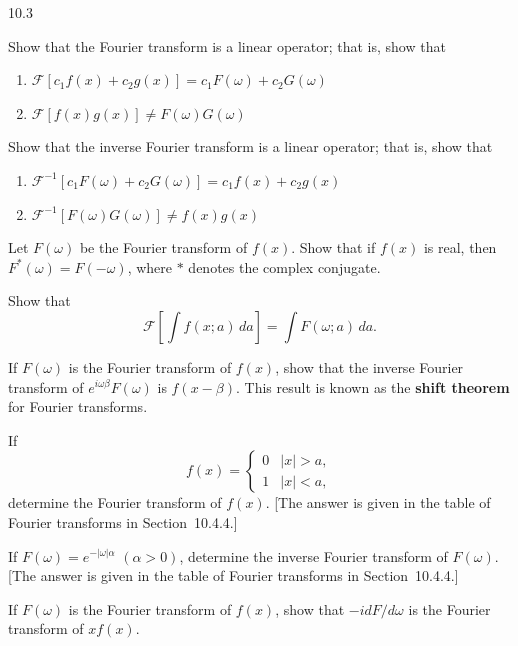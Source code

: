 \begin{exercises}{10.3}
\item Show that the Fourier transform is a linear operator; that is, show that
\begin{enumerate}
\item[(a)] $\mathcal{F}[c_1 f(x) + c_2 g(x)] = c_1 F(\omega) + c_2 G(\omega)$
\item[(b)] $\mathcal{F}[f(x)g(x)] \ne F(\omega)G(\omega)$
\end{enumerate}

\item Show that the inverse Fourier transform is a linear operator; that is, show that
\begin{enumerate}
\item[(a)] $\mathcal{F}^{-1}[c_1 F(\omega) + c_2 G(\omega)] = c_1 f(x) + c_2 g(x)$
\item[(b)] $\mathcal{F}^{-1}[F(\omega)G(\omega)] \ne f(x)g(x)$
\end{enumerate}

\item Let $F(\omega)$ be the Fourier transform of $f(x)$.  Show that if $f(x)$ is real, then $F^*(\omega) = F(-\omega)$, where $*$ denotes the complex conjugate.

\item Show that
\[
\mathcal{F}\left[\int f(x;a)\,da\right] = \int F(\omega;a)\,da.
\]

\item If $F(\omega)$ is the Fourier transform of $f(x)$, show that the inverse Fourier transform of $e^{i\omega\beta}F(\omega)$ is $f(x-\beta)$.  This result is known as the \textbf{shift theorem} for Fourier transforms.

\item[\starred 10.3.6.] If
\[
f(x) = \begin{cases} 0 & |x| > a, \\ 1 & |x| < a, \end{cases}
\]
determine the Fourier transform of $f(x)$.  [The answer is given in the table of Fourier transforms in Section~10.4.4.]

\item[\starred 10.3.7.] If $F(\omega) = e^{-|\omega|\alpha}$ $(\alpha > 0)$, determine the inverse Fourier transform of $F(\omega)$.  [The answer is given in the table of Fourier transforms in Section~10.4.4.]

\item[\starred 10.3.8.] If $F(\omega)$ is the Fourier transform of $f(x)$, show that $-idF/d\omega$ is the Fourier transform of $xf(x)$.


\end{exercises}
